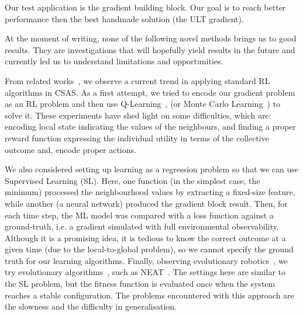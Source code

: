 \documentclass[conference]{IEEEtran}
\begin{document}
Our test application is the gradient building block. %
%
%
%
Our goal is to reach better performance then the best handmade solution (the ULT gradient).

At the moment of writing, none of the following novel methods brings us to good results. They are investigations that will hopefully yield results in the future and currently led us to understand limitations and opportunities.

From related works~\cite{DAngelo2019}, we observe a current trend in applying standard RL algorithms in CSAS.
%
As a first attempt, we tried to encode our gradient problem as an RL problem and then use Q-Learning~\cite{DBLP:journals/ras/Krose95}, (or Monte Carlo Learning~\cite{DBLP:conf/nips/Thrun99}) to solve it.
%
These experiments have shed light on some difficulties, which are: encoding local state indicating the values of the neighbours, and finding a proper reward function expressing the individual utility in terms of the collective outcome and, encode proper actions. 

We also considered setting up learning as a regression problem so that we can use Supervised Learning (SL).
%
Here, one function (in the simplest case, the minimum) processed the neighbourhood values by extracting a fixed-size feature, while another (a neural network) produced the gradient block result.
%
Then, for each time step, the ML model was compared with a loss function against a ground-truth, i.e. a gradient simulated with full environmental observability.
%
%
Although it is a promising idea, it is tedious to know the correct outcome at a given time (due to the local-to-global problem), so we cannot specify the ground truth for our learning algorithms.
%
Finally, observing evolutionary robotics~\cite{DBLP:journals/firai/DoncieuxBME15}, we try evolutionary algorithms~\cite{DBLP:books/daglib/0087893}, such as NEAT~\cite{DBLP:journals/ec/StanleyM02}.
%
The settings here are similar to the SL problem, but the fitness function is evaluated once when the system reaches a stable configuration.
%
%
The problems encountered with this approach are the slowness and the difficulty in generalisation.
%
\end{document}
